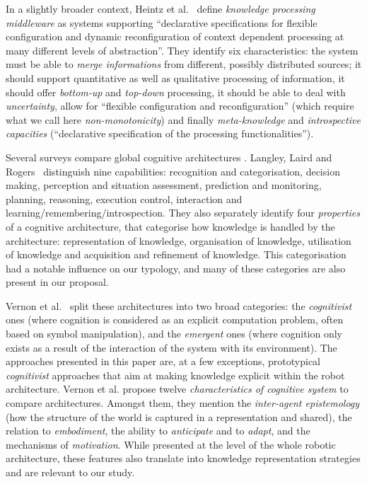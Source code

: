 \documentclass[a4paper, twocolumn]{article}
\begin{document}
In a slightly broader context, Heintz et al.~\cite{Heintz2008} define
\emph{knowledge processing middleware} as systems supporting ``declarative
specifications for flexible configuration and dynamic reconfiguration of
context dependent processing at many different levels of abstraction''. They
identify six characteristics: the system must be able to \emph{merge
informations} from different, possibly distributed sources; it should support
quantitative as well as qualitative processing of information, it should offer
\emph{bottom-up} and \emph{top-down} processing, it should be able to deal with
\emph{uncertainty}, allow for ``flexible configuration and reconfiguration''
(which require what we call here \emph{non-monotonicity}) and finally
\emph{meta-knowledge} and \emph{introspective capacities} (``declarative
specification of the processing functionalities'').

Several surveys compare global cognitive architectures \cite{Langley2006,
Vernon2007, Chong2009}. Langley, Laird and Rogers~\cite{Langley2006}
distinguish nine capabilities: recognition and categorisation, decision making,
perception and situation assessment, prediction and monitoring, planning,
reasoning, execution control, interaction and
learning/remembering/introspection. They also separately identify four
\emph{properties} of a cognitive architecture, that categorise how knowledge is
handled by the architecture: representation of knowledge, organisation of
knowledge, utilisation of knowledge and acquisition and refinement of
knowledge. This categorisation had a notable influence on our typology, and
many of these categories are also present in our proposal.

Vernon et al.~\cite{Vernon2007} split these architectures into two broad
categories: the \emph{cognitivist} ones (where cognition is considered as an
explicit computation problem, often based on symbol manipulation), and the
\emph{emergent} ones (where cognition only exists as a result of the
interaction of the system with its environment). The approaches presented in
this paper are, at a few exceptions, prototypical \emph{cognitivist} approaches
that aim at making knowledge explicit within the robot architecture. Vernon et
al. propose twelve \emph{characteristics of cognitive system} to compare
architectures. Amongst them, they mention the \emph{inter-agent epistemology}
(how the structure of the world is captured in a representation and shared),
the relation to \emph{embodiment}, the ability to \emph{anticipate} and to
\emph{adapt}, and the mechanisms of \emph{motivation}. While presented at the
level of the whole robotic architecture, these features also translate into
knowledge representation strategies and are relevant to our study.
\end{document}
